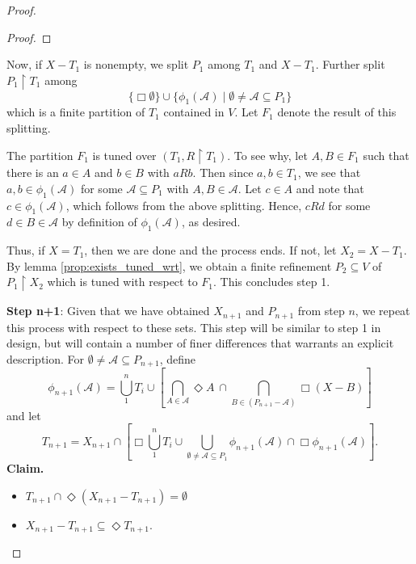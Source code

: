 \documentclass[submission]{eptcs}
\begin{document}
\begin{proof}
\begin{proof}
    \end{proof}

    Now, if $X-T_1$ is nonempty, we split $P_1$ among $T_1$ and $X-T_1$. Further split $P_1 \restriction T_1$ among 
    \[
    \{\Box\emptyset\}\cup\{\phi_1(\mathcal{A})\mid \emptyset\neq\mathcal{A} \subseteq P_1\}
    \]
    which is a finite partition of $T_1$ contained in $V$. Let $F_1$ denote the result of this splitting.
    \par
    The partition $F_1$ is tuned over $(T_1, R\restriction T_1)$.
        To see why, let $A,B \in F_1$ such that there is an $a \in A$ and $b \in B$ with $aRb$. Then since $a,b \in T_1$, we see that $a,b \in \phi_1(\mathcal{A})$ for some $\mathcal{A} \subseteq P_1$ with $A,B \in \mathcal{A}$.
        Let $c \in A$ and note that $c \in \phi_1(\mathcal{A})$, which follows from the above splitting.
        Hence, $cRd$ for some $d \in B \in \mathcal{A}$ by definition of $\phi_1(\mathcal{A})$, as desired.

    Thus, if $X=T_1$, then we are done and the process ends. If not, let $X_2=X-T_1$. 
    By lemma \ref{prop:exists_tuned_wrt}, we obtain a finite refinement $P_2\subseteq V$ of $P_1\restriction X_2$ which is tuned with respect to $F_1$.
    This concludes step 1.
    \par
    \textbf{Step n+1}: Given that we have obtained $X_{n+1}$ and $P_{n+1}$ from step $n$, we repeat this process with respect to these sets.
    This step will be similar to step 1 in design, but will contain a number of finer differences that warrants an explicit description.
    For $\emptyset\neq\mathcal{A}\subseteq P_{n+1}$, define
    \[
    \phi_{n+1} (\mathcal{A})= 
    \bigcup_1^n T_i\cup\left[ 
    \bigcap_{A \in \mathcal{A}} \Diamond A \ \cap
    \bigcap_{B \in (P_{n+1}-\mathcal{A})}\Box (X-B)
    \right]
    \]
    and let
    \[
    T_{n+1}=X_{n+1}\cap \left[ \Box\bigcup_1^n T_i \cup \bigcup_{\emptyset \neq\mathcal{A}\subseteq P_1}
    \phi_{n+1}(\mathcal{A}) \cap \Box\phi_{n+1}(\mathcal{A}) \right].
    \]
    \textbf{Claim.} 
    \begin{itemize}
    \item[(i)] $T_{n+1} \cap \Diamond(X_{n+1}-T_{n+1})=\emptyset$
    \item[(ii)] $X_{n+1}-T_{n+1} \subseteq \Diamond T_{n+1}$.
    \end{itemize}
    

\end{proof}
\end{document}
